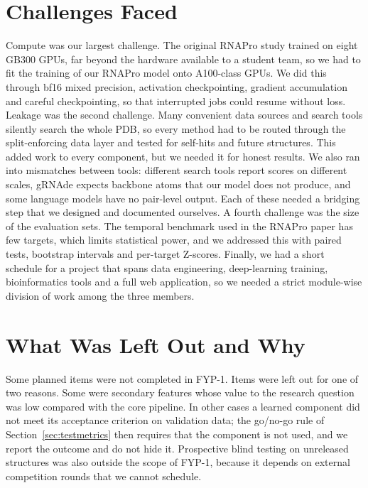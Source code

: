 \documentclass{FastFyp}
\begin{document}
\section{Challenges Faced}
Compute was our largest challenge. The original RNAPro study trained on eight GB300 GPUs, far beyond the hardware available to a student team, so we had to fit the training of our RNAPro model onto A100-class GPUs. We did this through bf16 mixed precision, activation checkpointing, gradient accumulation and careful checkpointing, so that interrupted jobs could resume without loss. Leakage was the second challenge. Many convenient data sources and search tools silently search the whole PDB, so every method had to be routed through the split-enforcing data layer and tested for self-hits and future structures. This added work to every component, but we needed it for honest results. We also ran into mismatches between tools: different search tools report scores on different scales, gRNAde expects backbone atoms that our model does not produce, and some language models have no pair-level output. Each of these needed a bridging step that we designed and documented ourselves. A fourth challenge was the size of the evaluation sets. The temporal benchmark used in the RNAPro paper has few targets, which limits statistical power, and we addressed this with paired tests, bootstrap intervals and per-target Z-scores. Finally, we had a short schedule for a project that spans data engineering, deep-learning training, bioinformatics tools and a full web application, so we needed a strict module-wise division of work among the three members.

\section{What Was Left Out and Why}
Some planned items were not completed in FYP-1. Items were left out for one of two reasons. Some were secondary features whose value to the research question was low compared with the core pipeline. In other cases a learned component did not meet its acceptance criterion on validation data; the go/no-go rule of Section~\ref{sec:testmetrics} then requires that the component is not used, and we report the outcome and do not hide it. Prospective blind testing on unreleased structures was also outside the scope of FYP-1, because it depends on external competition rounds that we cannot schedule.
\end{document}
